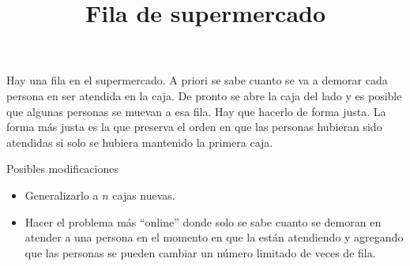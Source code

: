 \documentclass{article}
\begin{document}
\title{Fila de supermercado}
\maketitle

Hay una fila en el supermercado.
A priori se sabe cuanto se va a demorar cada persona en ser atendida en la caja.
De pronto se abre la caja del lado y es posible que algunas personas se muevan a esa fila.
Hay que hacerlo de forma justa.
La forma más justa es la que preserva el orden en que las personas hubieran sido atendidas si solo se hubiera mantenido la primera caja.

Posibles modificaciones
\begin{itemize}
  \item  Generalizarlo a $n$ cajas nuevas.
  \item Hacer el problema m\'as ``online'' donde solo se sabe cuanto se demoran en atender a una persona en el momento en que la están atendiendo y agregando que las personas se pueden cambiar un número limitado de veces de fila.
\end{itemize}
\end{document}
